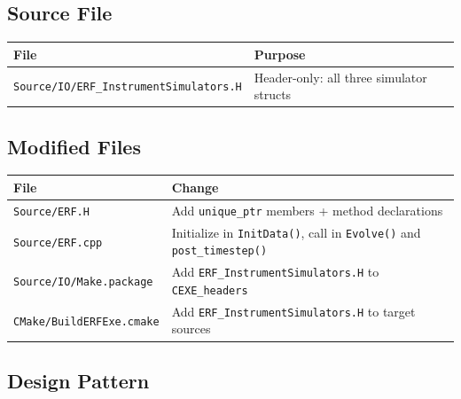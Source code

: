 \documentclass[11pt,letterpaper]{article}
\begin{document}
\subsection{Source File}

\begin{center}
\begin{tabular}{ll}
\toprule
File & Purpose \\
\midrule
\texttt{Source/IO/ERF\_InstrumentSimulators.H} & Header-only: all three simulator structs \\
\bottomrule
\end{tabular}
\end{center}

\subsection{Modified Files}

\begin{center}
\begin{tabular}{ll}
\toprule
File & Change \\
\midrule
\texttt{Source/ERF.H} & Add \texttt{unique\_ptr} members + method declarations \\
\texttt{Source/ERF.cpp} & Initialize in \texttt{InitData()}, call in \texttt{Evolve()} and \texttt{post\_timestep()} \\
\texttt{Source/IO/Make.package} & Add \texttt{ERF\_InstrumentSimulators.H} to \texttt{CEXE\_headers} \\
\texttt{CMake/BuildERFExe.cmake} & Add \texttt{ERF\_InstrumentSimulators.H} to target sources \\
\bottomrule
\end{tabular}
\end{center}

\subsection{Design Pattern}
\end{document}
